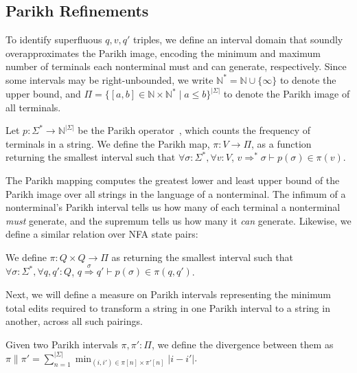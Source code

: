 \subsection{Parikh Refinements}

To identify superfluous $q, v, q'$ triples, we define an interval domain that soundly overapproximates the Parikh image, encoding the minimum and maximum number of terminals each nonterminal must and can generate, respectively. Since some intervals may be right-unbounded, we write $\mathbb{N}^*=\mathbb{N} \cup \{\infty\}$ to denote the upper bound, and $\Pi = \{[a, b] \in \mathbb{N} \times \mathbb{N}^* \mid a \leq b\}^{|\Sigma|}$ to denote the Parikh image of all terminals.

\begin{definition}\label{def:parikh}
Let $p: \Sigma^*\rightarrow\mathbb{N}^{|\Sigma|}$ be the Parikh operator~\cite{parikh1966context}, which counts the frequency of terminals in a string. We define the Parikh map, $\pi: V \rightarrow \Pi$, as a function returning the smallest interval such that $\forall \sigma: \Sigma^*, \forall v: V$, $v \Rightarrow^* \sigma \vdash p(\sigma) \in \pi(v)$.
\end{definition}

The Parikh mapping computes the greatest lower and least upper bound of the Parikh image over all strings in the language of a nonterminal. The infimum of a nonterminal's Parikh interval tells us how many of each terminal a nonterminal \textit{must} generate, and the supremum tells us how many it \textit{can} generate. Likewise, we define a similar relation over NFA state pairs:

\begin{definition}
  We define $\pi: Q\times Q \rightarrow \Pi$ as returning the smallest interval such that $\forall \sigma: \Sigma^*, \forall q, q': Q$, $q \overset{\sigma}{\Longrightarrow} q' \vdash p(\sigma) \in \pi(q, q')$.
\end{definition}

Next, we will define a measure on Parikh intervals representing the minimum total edits required to transform a string in one Parikh interval to a string in another, across all such pairings.

\begin{definition}
  Given two Parikh intervals $\pi, \pi': \Pi$, we define the divergence between them as $\pi \parallel \pi' = \sum_{n=1}^{|\Sigma|} \min_{(i, i') \in \pi[n]\times \pi'[n]} |i - i'|$.
\end{definition}

